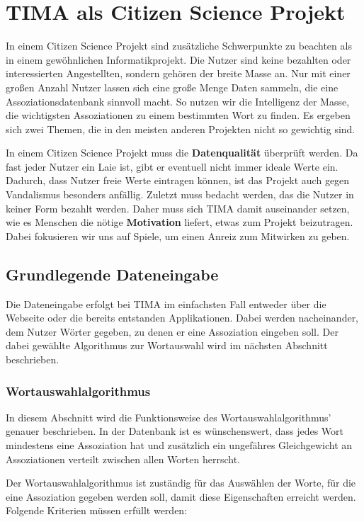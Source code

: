 \chapter{TIMA als Citizen Science Projekt}

In einem Citizen Science Projekt sind zusätzliche Schwerpunkte zu beachten als in einem gewöhnlichen Informatikprojekt. Die Nutzer sind keine bezahlten oder interessierten Angestellten, sondern gehören der breite Masse an. Nur mit einer großen Anzahl Nutzer lassen sich eine große Menge Daten sammeln, die eine Assoziationsdatenbank sinnvoll macht. So nutzen wir die Intelligenz der Masse, die wichtigsten Assoziationen zu einem bestimmten Wort zu finden. Es ergeben sich zwei Themen, die in den meisten anderen Projekten nicht so gewichtig sind.

In einem Citizen Science Projekt muss die \textbf{Datenqualität} überprüft werden. Da fast jeder Nutzer ein Laie ist, gibt er eventuell nicht immer ideale Werte ein. Dadurch, dass Nutzer freie Werte eintragen können, ist das Projekt auch gegen Vandalismus besonders anfällig. Zuletzt muss bedacht werden, das die Nutzer in keiner Form bezahlt werden. Daher muss sich TIMA damit auseinander setzen, wie es Menschen die nötige \textbf{Motivation} liefert, etwas zum Projekt beizutragen. Dabei fokusieren wir uns auf Spiele, um einen Anreiz zum Mitwirken zu geben.

\section{Grundlegende Dateneingabe}
Die Dateneingabe erfolgt bei TIMA im einfachsten Fall entweder über die Webseite oder die bereits entstanden Applikationen. Dabei werden nacheinander, dem Nutzer Wörter gegeben, zu denen er eine Assoziation eingeben soll. Der dabei gewählte Algorithmus zur Wortauswahl wird im nächsten Abschnitt beschrieben.

\subsection{Wortauswahlalgorithmus}\label{subsec:Wortauswahlalgorithmus}
In diesem Abschnitt wird die Funktionsweise des Wortauswahlalgorithmus' genauer beschrieben. In der Datenbank ist es wünschenswert, dass jedes Wort mindestens eine Assoziation hat und zusätzlich ein ungefähres Gleichgewicht an Assoziationen verteilt zwischen allen Worten herrscht.

\newpage
Der Wortauswahlalgorithmus ist zuständig für das Auswählen der Worte, für die eine Assoziation gegeben werden soll, damit diese Eigenschaften erreicht werden. Folgende Kriterien müssen erfüllt werden:

